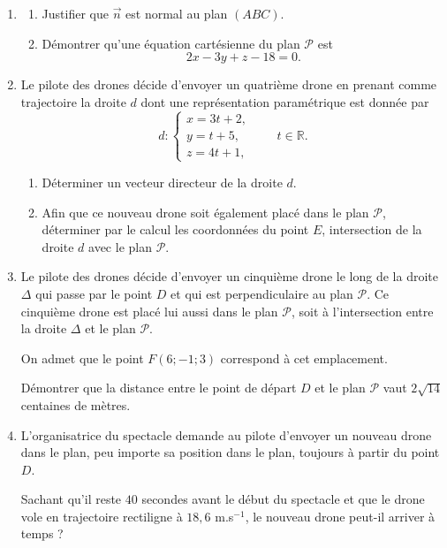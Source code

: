 \documentclass[11pt,a4paper]{article}
\begin{document}
\begin{enumerate}[resume]
  \item
  \begin{enumerate}
    \item Justifier que $\vec n$ est normal au plan $(ABC)$.
    \item Démontrer qu'une équation cartésienne du plan $\mathcal P$ est
    \[
    2x-3y+z-18=0.
    \]
  \end{enumerate}
  \item Le pilote des drones décide d'envoyer un quatrième drone en prenant comme trajectoire la droite $d$ dont une représentation paramétrique est donnée par
  \[
  d:\begin{cases}
  x=3t+2,\\
  y=t+5,\\
  z=4t+1,
  \end{cases}\qquad t\in\mathbb{R}.
  \]
  \begin{enumerate}
    \item Déterminer un vecteur directeur de la droite $d$.
    \item Afin que ce nouveau drone soit également placé dans le plan $\mathcal P$, déterminer par le calcul les coordonnées du point $E$, intersection de la droite $d$ avec le plan $\mathcal P$.
  \end{enumerate}
  \item Le pilote des drones décide d'envoyer un cinquième drone le long de la droite $\Delta$ qui passe par le point $D$ et qui est perpendiculaire au plan $\mathcal P$. Ce cinquième drone est placé lui aussi dans le plan $\mathcal P$, soit à l'intersection entre la droite $\Delta$ et le plan $\mathcal P$.

  On admet que le point $F(6;-1;3)$ correspond à cet emplacement.

  Démontrer que la distance entre le point de départ $D$ et le plan $\mathcal P$ vaut $2\sqrt{14}$ centaines de mètres.
  \item L'organisatrice du spectacle demande au pilote d'envoyer un nouveau drone dans le plan, peu importe sa position dans le plan, toujours à partir du point $D$.

  Sachant qu'il reste $40$ secondes avant le début du spectacle et que le drone vole en trajectoire rectiligne à $18{,}6$ m.s$^{-1}$, le nouveau drone peut-il arriver à temps ?
\end{enumerate}
\end{document}
